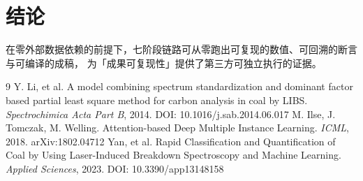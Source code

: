 \documentclass[11pt,a4paper,UTF8]{ctexart}
\begin{document}
\section{结论}
在零外部数据依赖的前提下，七阶段链路可从零跑出可复现的数值、可回溯的断言与可编译的成稿，
为「成果可复现性」提供了第三方可独立执行的证据。

\begin{thebibliography}{9}
 Y. Li, et al. A model combining spectrum standardization and dominant factor based partial least square method for carbon analysis in coal by LIBS. \textit{Spectrochimica Acta Part B}, 2014. DOI: 10.1016/j.sab.2014.06.017
 M. Ilse, J. Tomczak, M. Welling. Attention-based Deep Multiple Instance Learning. \textit{ICML}, 2018. arXiv:1802.04712
 Yan, et al. Rapid Classification and Quantification of Coal by Using Laser-Induced Breakdown Spectroscopy and Machine Learning. \textit{Applied Sciences}, 2023. DOI: 10.3390/app13148158
\end{thebibliography}
\end{document}
